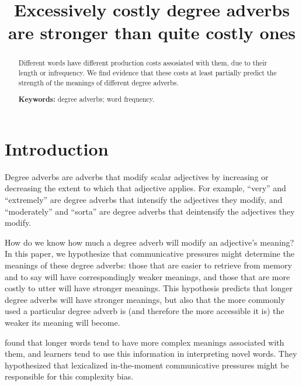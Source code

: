 \documentclass[10pt,letterpaper]{article}
\title{Excessively costly degree adverbs are stronger than quite costly ones}
\author{
  }
\begin{document}
\maketitle

\begin{abstract}
Different words have different production costs assosiated with them, due to their length or infrequency. We find evidence that these costs at least partially predict the strength of the meanings of different degree adverbs.

\textbf{Keywords:} 
degree adverbs; word frequency.
\end{abstract}

\section{Introduction}

Degree adverbs are adverbs that modify scalar adjectives by increasing or decreasing the extent to which that adjective applies. For example, ``very'' and ``extremely'' are degree adverbs that intensify the adjectives they modify, and ``moderately'' and ``sorta'' are degree adverbs that deintensify the adjectives they modify.

How do we know how much a degree adverb will modify an adjective's meaning? In this paper, we hypothesize that communicative pressures might determine the meanings of these degree adverbs: those that are easier to retrieve from memory and to say will have correspondingly weaker meanings, and those that are more costly to utter will have stronger meanings. This hypothesis predicts that longer degree adverbs will have stronger meanings, but also that the more commonly used a particular degree adverb is (and therefore the more accessible it is) the weaker its meaning will become.


 found that longer words tend to have more complex meanings associated with them, and learners tend to use this information in interpreting novel words. They hypothesized that lexicalized in-the-moment communicative pressures might be responsible for this complexity bias.
\end{document}
